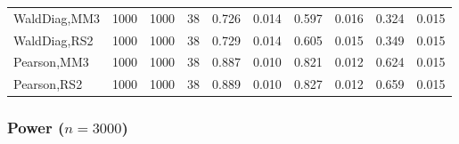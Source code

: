 \documentclass[
]{article}
\begin{document}
\begin{table}[H]
{\begin{tabular}[t]{lrrrrrrlrr}
\hspace{1em}WaldDiag,MM3 & 1000 & 1000 & 38 & 0.726 & 0.014 & 0.597 & 0.016 & 0.324 & 0.015\\
\hspace{1em}WaldDiag,RS2 & 1000 & 1000 & 38 & 0.729 & 0.014 & 0.605 & 0.015 & 0.349 & 0.015\\
\hspace{1em}Pearson,MM3 & 1000 & 1000 & 38 & 0.887 & 0.010 & 0.821 & 0.012 & 0.624 & 0.015\\
\hspace{1em}Pearson,RS2 & 1000 & 1000 & 38 & 0.889 & 0.010 & 0.827 & 0.012 & 0.659 & 0.015\\
\bottomrule
\end{tabular}}
\endgroup{}
\end{table}

\hypertarget{power-n3000-3}{%
\subsubsection{\texorpdfstring{Power
(\(n=3000\))}{Power (n=3000)}}\label{power-n3000-3}}
\end{document}
